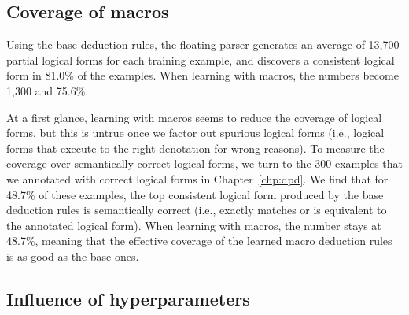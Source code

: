 \subsection{Coverage of macros}
Using the base deduction rules,
the floating parser generates an average of 13,700
partial logical forms for each training example,
and discovers a consistent logical form
in 81.0\% of the examples.
When learning with macros,
the numbers become 1,300 and 75.6\%.

At a first glance,
learning with macros seems to
reduce the coverage of logical forms,
but this is untrue once we factor out spurious logical forms
(i.e., logical forms that execute to the right denotation
for wrong reasons).
To measure the coverage over semantically correct logical forms,
we turn to the 300 examples that
we annotated with correct logical forms in Chapter~\ref{chp:dpd}.
We find that for 48.7\% of these examples,
the top consistent logical form produced
by the base deduction rules is semantically correct
(i.e., exactly matches
or is equivalent to the annotated logical form).
When learning with macros,
the number stays at 48.7\%,
meaning that the effective coverage
of the learned macro deduction rules
is as good as the base ones.


% 


\subsection{Influence of hyperparameters}

